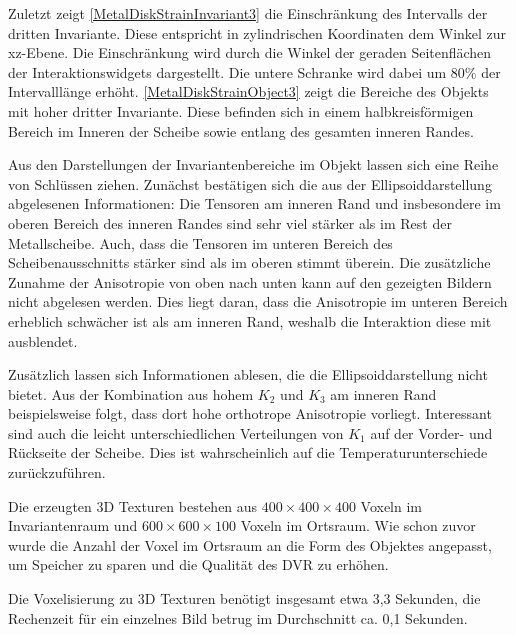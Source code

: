 \documentclass[a4paper,fontsize=12pt,toc=bib,parskip=half,ngerman]{scrartcl}
\begin{document}
Zuletzt zeigt \cref{MetalDiskStrainInvariant3} die Einschr\"ankung des Intervalls der dritten Invariante. Diese entspricht in zylindrischen Koordinaten dem Winkel zur xz-Ebene. Die Einschr\"ankung wird durch die Winkel der geraden Seitenfl\"achen der Interaktionswidgets dargestellt. Die untere Schranke wird dabei um 80\% der Intervalll\"ange erh\"oht. \cref{MetalDiskStrainObject3} zeigt die Bereiche des Objekts mit hoher dritter Invariante. Diese befinden sich in einem halbkreisf\"ormigen Bereich im Inneren der Scheibe sowie entlang des gesamten inneren Randes.

Aus den Darstellungen der Invariantenbereiche im Objekt lassen sich eine Reihe von Schl\"ussen ziehen. Zun\"achst best\"atigen sich die aus der Ellipsoiddarstellung abgelesenen Informationen: Die Tensoren am inneren Rand und insbesondere im oberen Bereich des inneren Randes sind sehr viel st\"arker als im Rest der Metallscheibe. Auch, dass die Tensoren im unteren Bereich des Scheibenausschnitts st\"arker sind als im oberen stimmt \"uberein. Die zus\"atzliche Zunahme der Anisotropie von oben nach unten kann auf den gezeigten Bildern nicht abgelesen werden. Dies liegt daran, dass die Anisotropie im unteren Bereich erheblich schw\"acher ist als am inneren Rand, weshalb die Interaktion diese mit ausblendet.

Zus\"atzlich lassen sich Informationen ablesen, die die Ellipsoiddarstellung nicht bietet. Aus der Kombination aus hohem $K_2$ und $K_3$ am inneren Rand beispielsweise folgt, dass dort hohe orthotrope Anisotropie vorliegt. Interessant sind auch die leicht unterschiedlichen Verteilungen von $K_1$ auf der Vorder- und R\"uckseite der Scheibe. Dies ist wahrscheinlich auf die Temperaturunterschiede zur\"uckzuf\"uhren. 

Die erzeugten 3D Texturen bestehen aus $400\times400\times400$ Voxeln im Invariantenraum und $600\times600\times100$ Voxeln im Ortsraum. Wie schon zuvor wurde die Anzahl der Voxel im Ortsraum an die Form des Objektes angepasst, um Speicher zu sparen und die Qualit\"at des DVR zu erh\"ohen.

Die Voxelisierung zu 3D Texturen ben\"otigt insgesamt etwa 3,3 Sekunden, die Rechenzeit f\"ur ein einzelnes Bild betrug im Durchschnitt ca. 0,1 Sekunden.
\end{document}
